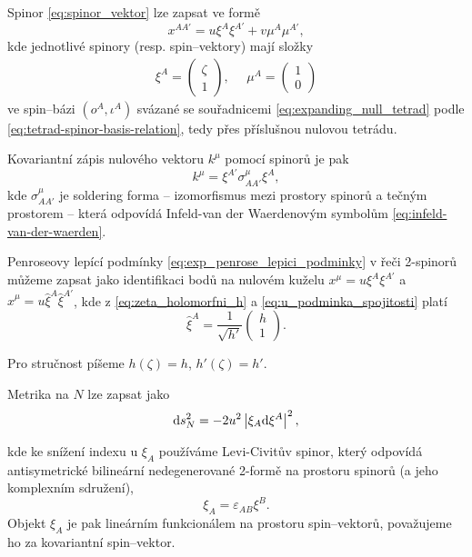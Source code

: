 Spinor \eqref{eq:spinor_vektor} lze zapsat ve formě
\begin{equation}
    \label{spinor_position}
    x^{AA'} = u \xi^A \xi^{A'} + v \mu^A \mu^{A'},
\end{equation}
kde jednotlivé spinory (resp. spin--vektory) mají složky
\begin{align}
    \label{eq:xi_mu_explicitne_v_bazi}
    \xi^A = \begin{pmatrix}
        \zeta \\ 1
    \end{pmatrix}, ~~~~~~ \mu^A = \begin{pmatrix}
        1 \\ 0
    \end{pmatrix}
\end{align}
ve spin--bázi $(o^A, \iota^A)$ svázané se souřadnicemi \eqref{eq:expanding_null_tetrad} podle \eqref{eq:tetrad-spinor-basis-relation}, tedy
přes příslušnou nulovou tetrádu.

Kovariantní zápis nulového vektoru $k^\mu$ pomocí spinorů je pak
\begin{equation}
    k^\mu = \xi^{A'} \sigma^\mu_{AA'} \xi^{A},
\end{equation}
kde $\sigma^\mu_{AA'}$ je soldering forma -- izomorfismus mezi prostory spinorů a tečným prostorem -- která
odpovídá Infeld-van der Waerdenovým symbolům \eqref{eq:infeld-van-der-waerden}.

Penroseovy lepící podmínky \eqref{eq:exp_penrose_lepici_podminky} v řeči 2-spinorů můžeme zapsat jako
identifikaci bodů na nulovém kuželu $x^\mu = u \xi^A \xi^{A'}$ a $\hat{x}^\mu = u \hat{\xi}^A \hat{\xi}^{A'}$,
kde z \eqref{eq:zeta_holomorfni_h} a \eqref{eq:u_podminka_spojitosti} platí
\begin{equation}
    \label{eq:xi_transformace}
    \hat{\xi}^A = \frac{1}{\sqrt{h'}} \begin{pmatrix}
        h \\ 1
    \end{pmatrix}.
\end{equation}

Pro stručnost píšeme $h(\zeta) = h$, $h'(\zeta) = h'$.

Metrika na $N$ lze zapsat jako
\begin{equation}
    \mathrm{d} s_N^2 = - 2 u^2 \left| \xi_A \mathrm{d} \xi^A \right|^2,
\end{equation}

kde ke snížení indexu u $\xi_A$ používáme Levi-Civitův spinor, který odpovídá
antisymetrické bilineární nedegenerované 2-formě na prostoru spinorů (a jeho komplexním sdružení),
\begin{equation}
    \xi_A = \varepsilon_{AB} \xi^B.
\end{equation}
Objekt $\xi_A$ je pak lineárním funkcionálem na prostoru spin--vektorů, považujeme ho za kovariantní spin--vektor.

